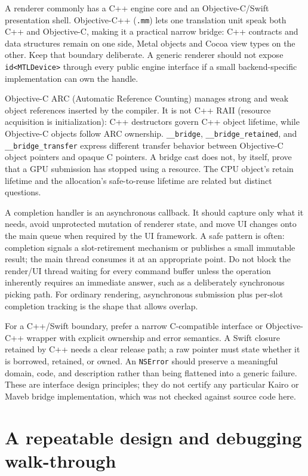 A renderer commonly has a C++ engine core and an Objective-C/Swift presentation shell. Objective-C++ (\texttt{.mm}) lets one translation unit speak both C++ and Objective-C, making it a practical narrow bridge: C++ contracts and data structures remain on one side, Metal objects and Cocoa view types on the other. Keep that boundary deliberate. A generic renderer should not expose \texttt{id\textless{}MTLDevice\textgreater{}} through every public engine interface if a small backend-specific implementation can own the handle.

Objective-C ARC (Automatic Reference Counting) manages strong and weak object references inserted by the compiler. It is not C++ RAII (resource acquisition is initialization): C++ destructors govern C++ object lifetime, while Objective-C objects follow ARC ownership. \texttt{\_\_bridge}, \texttt{\_\_bridge\_retained}, and \texttt{\_\_bridge\_transfer} express different transfer behavior between Objective-C object pointers and opaque C pointers. A bridge cast does not, by itself, prove that a GPU submission has stopped using a resource. The CPU object's retain lifetime and the allocation's safe-to-reuse lifetime are related but distinct questions.

A completion handler is an asynchronous callback. It should capture only what it needs, avoid unprotected mutation of renderer state, and move UI changes onto the main queue when required by the UI framework. A safe pattern is often: completion signals a slot-retirement mechanism or publishes a small immutable result; the main thread consumes it at an appropriate point. Do not block the render/UI thread waiting for every command buffer unless the operation inherently requires an immediate answer, such as a deliberately synchronous picking path. For ordinary rendering, asynchronous submission plus per-slot completion tracking is the shape that allows overlap.

For a C++/Swift boundary, prefer a narrow C-compatible interface or Objective-C++ wrapper with explicit ownership and error semantics. A Swift closure retained by C++ needs a clear release path; a raw pointer must state whether it is borrowed, retained, or owned. An \texttt{NSError} should preserve a meaningful domain, code, and description rather than being flattened into a generic failure. These are interface design principles; they do not certify any particular Kairo or Maveb bridge implementation, which was not checked against source code here.

\section{A repeatable design and debugging walk-through}\label{05-engine-i-ch019-a-repeatable-design-and-debugging-walk-through}

